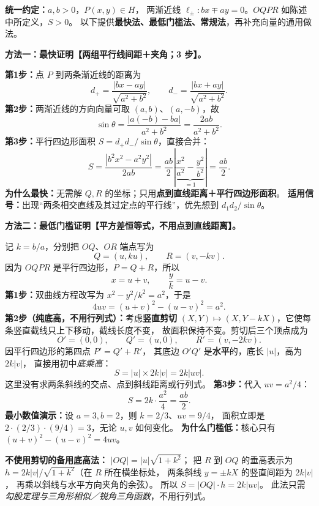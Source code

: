 \clearpage
\begin{proofbox}
\textbf{统一约定：}$a,b>0$，$P(x,y)\in H$，
两渐近线 $\ell_\pm:bx\mp ay=0$。$OQPR$ 如陈述中所定义，$S>0$。
以下提供\textbf{最快法、最低门槛法、常规法}，再补充向量的通用做法。

\medskip
\textbf{方法一：最快证明【两组平行线间距＋夹角；3 步】。}

\begin{center}

\end{center}

\textbf{第1步：}点 $P$ 到两条渐近线的距离为
\[
d_+=\frac{|bx-ay|}{\sqrt{a^2+b^2}},\qquad
 d_-=\frac{|bx+ay|}{\sqrt{a^2+b^2}}.
\]
\textbf{第2步：}两渐近线的方向向量可取 $(a,b)$、$(a,-b)$，故
\[
\sin\theta=\frac{|a(-b)-ba|}{a^2+b^2}
=\frac{2ab}{a^2+b^2}.
\]
\textbf{第3步：}平行四边形面积 $S=d_+d_-/\sin\theta$，直接合并：
\[
\boxed{S=\frac{|b^2x^2-a^2y^2|}{2ab}}
=\frac{ab}{2}\left|\underbrace{\frac{x^2}{a^2}-\frac{y^2}{b^2}}_{=1}\right|
=\boxed{\frac{ab}{2}}.
\]
\textbf{为什么最快：}无需解 $Q,R$ 的坐标；只用\textbf{点到直线距离＋平行四边形面积}。
\textbf{适用信号：}出现“两条相交直线及其过定点的平行线”，优先想到 $d_1d_2/\sin\theta$。
\end{proofbox}

\clearpage
\begin{proofbox}
\textbf{方法二：最低门槛证明【平方差恒等式，不用点到直线距离】。}

\begin{center}

\end{center}

记 $k=b/a$，分别把 $OQ$、$OR$ 端点写为
\[
Q=(u,ku),\qquad R=(v,-kv).
\]
因为 $OQPR$ 是平行四边形，$P=Q+R$，所以
\[
x=u+v,\qquad \frac yk=u-v.
\]
\textbf{第1步：}双曲线方程改写为 $x^2-y^2/k^2=a^2$，于是
\[
\boxed{4uv=(u+v)^2-(u-v)^2=a^2}.
\]
\textbf{第2步（纯底高，不用行列式）：}考虑\textbf{竖直剪切}
$(X,Y)\mapsto(X,Y-kX)$，它使每条竖直截线只上下移动，截线长度不变，
故面积保持不变。剪切后三个顶点成为
\[
O'=(0,0),\qquad Q'=(u,0),\qquad R'=(v,-2kv).
\]
因平行四边形的第四点 $P'=Q'+R'$，
其底边 $O'Q'$ 是\textbf{水平}的，底长 $|u|$，高为 $2k|v|$，
直接用初中\emph{底乘高}：
\[
\boxed{S=|u|\times 2k|v|=2k|uv|}.
\]
这里没有求两条斜线的交点、点到斜线距离或行列式。
\textbf{第3步：}代入 $uv=a^2/4$：
\[
S=2k\cdot\frac{a^2}{4}=\boxed{\frac{ab}{2}}.
\]
\textbf{最小数值演示：}设 $a=3,b=2$，则 $k=2/3$、$uv=9/4$，
面积立即是 $2\cdot(2/3)\cdot(9/4)=3$，无论 $u,v$ 如何变化。
\textbf{为什么门槛低：}核心只有 $\boxed{(u+v)^2-(u-v)^2=4uv}$。

\textbf{不使用剪切的备用底高法：}
$|OQ|=|u|\sqrt{1+k^2}$；
把 $R$ 到 $OQ$ 的垂高表示为
$h=2k|v|/\sqrt{1+k^2}$（在 $R$ 所在横坐标处，
两条斜线 $y=\pm kX$ 的竖直间距为 $2k|v|$，
再乘以斜线与水平方向夹角的余弦）。
所以 $S=|OQ|\cdot h=2k|uv|$。
此法只需\emph{勾股定理与三角形相似／锐角三角函数}，不用行列式。
\end{proofbox}

